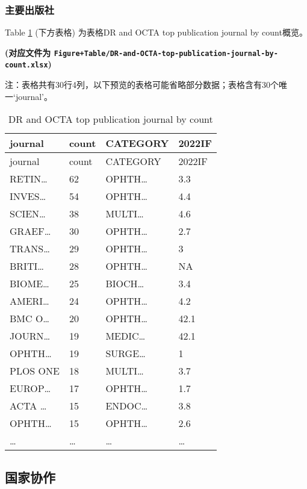 \documentclass[
]{article}
\begin{document}
\hypertarget{ux4e3bux8981ux51faux7248ux793e}{%
\subsubsection{主要出版社}\label{ux4e3bux8981ux51faux7248ux793e}}

Table \ref{tab:DR-and-OCTA-top-publication-journal-by-count} (下方表格) 为表格DR and OCTA top publication journal by count概览。

\textbf{(对应文件为 \texttt{Figure+Table/DR-and-OCTA-top-publication-journal-by-count.xlsx})}

\begin{center}\begin{tcolorbox}[colback=gray!10, colframe=gray!50, width=0.9\linewidth, arc=1mm, boxrule=0.5pt]注：表格共有30行4列，以下预览的表格可能省略部分数据；表格含有30个唯一`journal'。
\end{tcolorbox}
\end{center}

\begin{longtable}[]{@{}llll@{}}
\caption{\label{tab:DR-and-OCTA-top-publication-journal-by-count}DR and OCTA top publication journal by count}\tabularnewline
\toprule
journal & count & CATEGORY & 2022IF\tabularnewline
\midrule
\endfirsthead
\toprule
journal & count & CATEGORY & 2022IF\tabularnewline
\midrule
\endhead
RETIN\ldots{} & 62 & OPHTH\ldots{} & 3.3\tabularnewline
INVES\ldots{} & 54 & OPHTH\ldots{} & 4.4\tabularnewline
SCIEN\ldots{} & 38 & MULTI\ldots{} & 4.6\tabularnewline
GRAEF\ldots{} & 30 & OPHTH\ldots{} & 2.7\tabularnewline
TRANS\ldots{} & 29 & OPHTH\ldots{} & 3\tabularnewline
BRITI\ldots{} & 28 & OPHTH\ldots{} & NA\tabularnewline
BIOME\ldots{} & 25 & BIOCH\ldots{} & 3.4\tabularnewline
AMERI\ldots{} & 24 & OPHTH\ldots{} & 4.2\tabularnewline
BMC O\ldots{} & 20 & OPHTH\ldots{} & 42.1\tabularnewline
JOURN\ldots{} & 19 & MEDIC\ldots{} & 42.1\tabularnewline
OPHTH\ldots{} & 19 & SURGE\ldots{} & 1\tabularnewline
PLOS ONE & 18 & MULTI\ldots{} & 3.7\tabularnewline
EUROP\ldots{} & 17 & OPHTH\ldots{} & 1.7\tabularnewline
ACTA \ldots{} & 15 & ENDOC\ldots{} & 3.8\tabularnewline
OPHTH\ldots{} & 15 & OPHTH\ldots{} & 2.6\tabularnewline
\ldots{} & \ldots{} & \ldots{} & \ldots{}\tabularnewline
\bottomrule
\end{longtable}

\hypertarget{ux56fdux5bb6ux534fux4f5c}{%
\subsection{国家协作}\label{ux56fdux5bb6ux534fux4f5c}}
\end{document}
